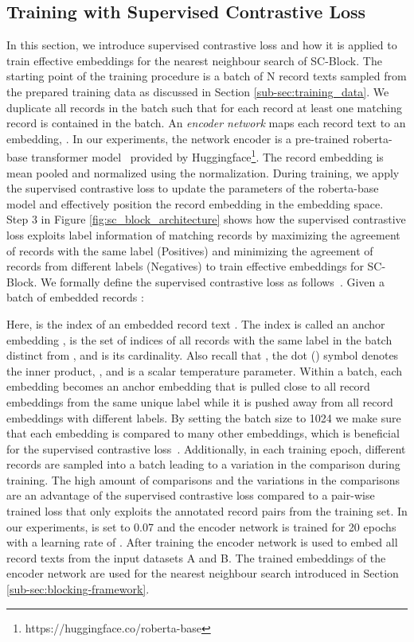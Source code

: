 \documentclass[sigconf,nonacm]{acmart}
\begin{document}
\subsection{Training with Supervised Contrastive Loss}
\label{sub-sec:supervised_contrastive_loss}
In this section, we introduce supervised contrastive loss and how it is applied to train effective embeddings for the nearest neighbour search of SC-Block.
The starting point of the training procedure is a batch of N record texts  sampled from the prepared training data as discussed in Section \ref{sub-sec:training_data}.
We duplicate all records in the batch such that for each record at least one matching record is contained in the batch.
An \textit{encoder network}  maps each
record text  to an embedding, . 
In our experiments, the network encoder  is a pre-trained roberta-base transformer model~\cite{liu_roberta_2019} provided by Huggingface\footnote{https://huggingface.co/roberta-base}.
The record embedding  is mean pooled and normalized using the  normalization. 
During training, we apply the supervised contrastive loss to update the parameters of the roberta-base model and effectively position the record embedding in the embedding space.
Step 3 in Figure \ref{fig:sc_block_architecture} shows how the supervised contrastive loss exploits label information of matching records by maximizing the agreement of records with the same label (Positives) and minimizing the agreement of records from different labels (Negatives) to train effective embeddings for SC-Block.
We formally define the supervised contrastive loss as follows~\cite{khosla_supervised_2020}.
Given a batch of  embedded records :

Here,  is the index of an embedded record text . 
The index  is called an anchor embedding ,  is the set of indices of all records with the same label in the batch distinct from , and  is its cardinality. Also recall that , the dot () symbol denotes the inner product, , and  is a scalar temperature parameter. 
Within a batch, each embedding becomes an anchor embedding  that is pulled close to all record embeddings from the same unique label while it is pushed away from all record embeddings with different labels. By setting the batch size to 1024 we make sure that each embedding is compared to many other embeddings, which is beneficial for the supervised contrastive loss~\cite{khosla_supervised_2020}. Additionally, in each training epoch, different records are sampled into a batch leading to a variation in the comparison during training.
The high amount of comparisons and the variations in the comparisons are an advantage of the supervised contrastive loss compared to a pair-wise trained loss that only exploits the annotated record pairs from the training set.
In our experiments,  is set to 0.07 and the encoder network is trained for 20 epochs with a learning rate of .
After training the encoder network is used to embed all record texts from the input datasets A and B. The trained embeddings  of the encoder network are used for the nearest neighbour search introduced in Section \ref{sub-sec:blocking-framework}.
\end{document}

